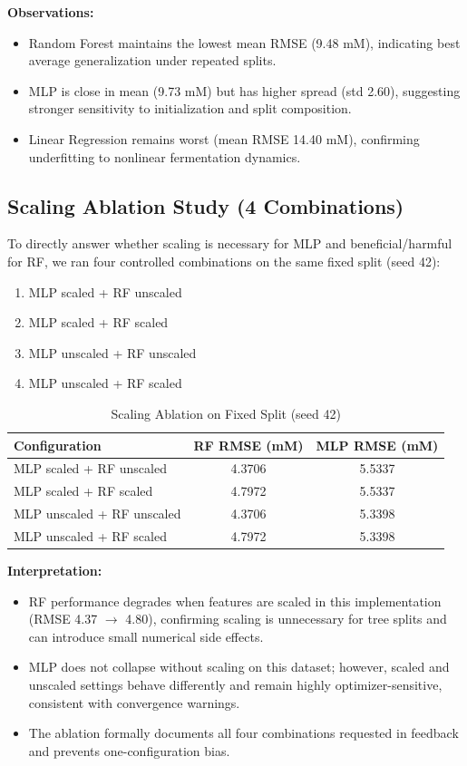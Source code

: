 \documentclass[conference]{IEEEtran}
\begin{document}
\textbf{Observations:}
\begin{itemize}
\item Random Forest maintains the lowest mean RMSE (9.48 mM), indicating best average generalization under repeated splits.
\item MLP is close in mean (9.73 mM) but has higher spread (std 2.60), suggesting stronger sensitivity to initialization and split composition.
\item Linear Regression remains worst (mean RMSE 14.40 mM), confirming underfitting to nonlinear fermentation dynamics.
\end{itemize}

\subsection{Scaling Ablation Study (4 Combinations)}
To directly answer whether scaling is necessary for MLP and beneficial/harmful for RF, we ran four controlled combinations on the same fixed split (seed 42):
\begin{enumerate}
\item MLP scaled + RF unscaled
\item MLP scaled + RF scaled
\item MLP unscaled + RF unscaled
\item MLP unscaled + RF scaled
\end{enumerate}

\begin{table}[htbp]
\caption{Scaling Ablation on Fixed Split (seed 42)}
\centering
\begin{tabular}{lcc}
\toprule
Configuration & RF RMSE (mM) & MLP RMSE (mM) \\
\midrule
MLP scaled + RF unscaled & 4.3706 & 5.5337 \\
MLP scaled + RF scaled & 4.7972 & 5.5337 \\
MLP unscaled + RF unscaled & 4.3706 & 5.3398 \\
MLP unscaled + RF scaled & 4.7972 & 5.3398 \\
\bottomrule
\end{tabular}
\end{table}

\textbf{Interpretation:}
\begin{itemize}
\item RF performance degrades when features are scaled in this implementation (RMSE 4.37 $\to$ 4.80), confirming scaling is unnecessary for tree splits and can introduce small numerical side effects.
\item MLP does not collapse without scaling on this dataset; however, scaled and unscaled settings behave differently and remain highly optimizer-sensitive, consistent with convergence warnings.
\item The ablation formally documents all four combinations requested in feedback and prevents one-configuration bias.
\end{itemize}
\end{document}
